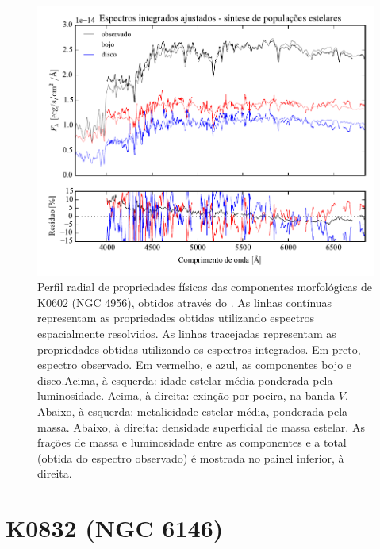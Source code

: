 \begin{figure}
	\includegraphics[page=8]{figuras/sample006a_synthesis}
	\caption[Propriedades físicas das componentes morfológicas de K0602 (NGC 4956)]
	{Perfil radial de propriedades físicas das componentes morfológicas de
	K0602 (NGC 4956), obtidos através do \starlight. As linhas contínuas
	representam as propriedades obtidas utilizando espectros espacialmente
	resolvidos. As linhas tracejadas representam as propriedades obtidas utilizando
	os espectros integrados. Em preto, espectro observado. Em vermelho, e azul, as
	componentes bojo e disco.Acima, à esquerda: idade estelar média ponderada pela
	luminosidade. Acima, à direita: exinção por poeira, na banda $V$. Abaixo, à
	esquerda: metalicidade estelar média, ponderada pela massa. Abaixo, à direita:
	densidade superficial de massa estelar. As frações de massa e luminosidade
	entre as componentes e a total (obtida do espectro observado) é mostrada no
	painel inferior, à direita.}
	\label{fig:decompSinteseRadprof:K0602}
\end{figure}


\section{K0832 (NGC 6146)}
\label{apendice:Decomp:K0832}


